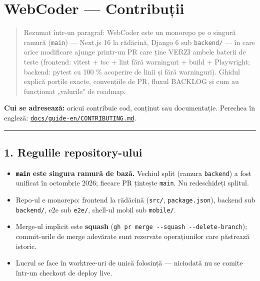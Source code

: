\documentclass[
]{article}
\author{}
\date{}
\providecommand{\tightlist}{%
  \setlength{\itemsep}{0pt}\setlength{\parskip}{0pt}}
\begin{document}
{
\setcounter{tocdepth}{2}
\tableofcontents
}
\section{WebCoder --- Contribuții}\label{webcoder--contribuux21bii}

\begin{quote}
Rezumat într-un paragraf: WebCoder este un monorepo pe o singură ramură
(\texttt{main}) --- Next.js 16 la rădăcină, Django 6 sub
\texttt{backend/} --- în care orice modificare ajunge printr-un PR care
ține VERZI ambele baterii de teste (frontend: vitest + tsc + lint fără
warninguri + build + Playwright; backend: pytest cu 100 \% acoperire de
linii și fără warninguri). Ghidul explică porțile exacte, convențiile de
PR, fluxul BACKLOG și cum au funcționat „valurile" de roadmap.
\end{quote}

\textbf{Cui se adresează:} oricui contribuie cod, conținut sau
documentație. Perechea în engleză:
\href{../guide-en/CONTRIBUTING.md}{\texttt{docs/guide-en/CONTRIBUTING.md}}.

\begin{center}\rule{0.5\linewidth}{0.5pt}\end{center}

\subsection{1. Regulile
repository-ului}\label{1-regulile-repository-ului}

\begin{itemize}
\tightlist
\item
  \textbf{\texttt{main} este singura ramură de bază.} Vechiul split
  (ramura \texttt{backend}) a fost unificat în octombrie 2026; fiecare
  PR țintește \texttt{main}. Nu redeschideți splitul.
\item
  Repo-ul e monorepo: frontend la rădăcină (\texttt{src/},
  \texttt{package.json}), backend sub \texttt{backend/}, e2e sub
  \texttt{e2e/}, shell-ul mobil sub \texttt{mobile/}.
\item
  Merge-ul implicit este \textbf{squash}
  (\texttt{gh\ pr\ merge\ -\/-squash\ -\/-delete-branch}); commit-urile
  de merge adevărate sunt rezervate operațiunilor care păstrează
  istoric.
\item
  Lucrul se face în worktree-uri de unică folosință --- niciodată nu se
  comite într-un checkout de deploy live.
\end{itemize}
\end{document}
